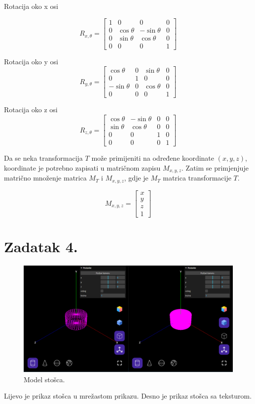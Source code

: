 \documentclass[a4paper,12pt]{article}
\begin{document}
Rotacija oko x osi

\[
R_{x,\theta}=
\begin{bmatrix}
    1 & 0 & 0 & 0 \\
    0 & \cos{\theta} & -\sin{\theta} & 0 \\
    0 & \sin{\theta} & \cos{\theta} & 0 \\
    0 & 0 & 0 & 1
\end{bmatrix}
\]

Rotacija oko y osi
\[
R_{y,\theta}=
\begin{bmatrix}
    \cos{\theta} & 0 & \sin{\theta} & 0 \\
    0 & 1 & 0 & 0 \\
    -\sin{\theta} & 0 & \cos{\theta} & 0 \\
    0 & 0 & 0 & 1
\end{bmatrix}
\]

Rotacija oko z osi
\[
R_{z,\theta}=
\begin{bmatrix}
    \cos{\theta} & -\sin{\theta} & 0 & 0 \\
    \sin{\theta} & \cos{\theta} & 0 & 0 \\
    0 & 0 & 1 & 0 \\
    0 & 0 & 0 & 1
\end{bmatrix}
\]

\pagebreak

Da se neka transformacija $T$ može primijeniti na određene koordinate $(x, y, z)$, koordinate je
potrebno zapisati u matričnom zapisu $M_{x,y,z}$. Zatim se primjenjuje matrično množenje
matrica $M_T$ i $M_{x,y,z}$, gdje je $M_T$ matrica transformacije $T$.

\[
M_{x,y,z}=
\begin{bmatrix}
    x \\
    y \\
    z \\
    1
\end{bmatrix}
\]
\pagebreak

\section{Zadatak 4.}

\begin{figure}[ht]
    \centering
    \includegraphics[scale=0.5]{image/zadatak4.png}
    \caption{Model stošca.}
\end{figure}
Lijevo je prikaz stošca u mrežastom prikazu. Desno je prikaz stošca sa teksturom.
\end{document}
